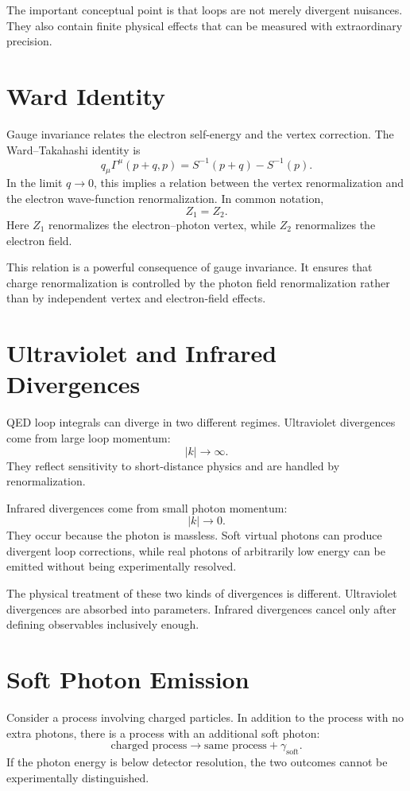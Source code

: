The important conceptual point is that loops are not merely divergent nuisances.
They also contain finite physical effects that can be measured with extraordinary
precision.

\section{Ward Identity}

Gauge invariance relates the electron self-energy and the vertex correction. The
Ward--Takahashi identity is
\[
    q_\mu\Gamma^\mu(p+q,p)
    = S^{-1}(p+q)-S^{-1}(p).
\]
In the limit \(q\to0\), this implies a relation between the vertex
renormalization and the electron wave-function renormalization. In common
notation,
\[
    Z_1=Z_2.
\]
Here \(Z_1\) renormalizes the electron--photon vertex, while \(Z_2\) renormalizes
the electron field.

This relation is a powerful consequence of gauge invariance. It ensures that
charge renormalization is controlled by the photon field renormalization rather
than by independent vertex and electron-field effects.

\section{Ultraviolet and Infrared Divergences}

QED loop integrals can diverge in two different regimes. Ultraviolet divergences
come from large loop momentum:
\[
    |k|\to\infty.
\]
They reflect sensitivity to short-distance physics and are handled by
renormalization.

Infrared divergences come from small photon momentum:
\[
    |k|\to0.
\]
They occur because the photon is massless. Soft virtual photons can produce
divergent loop corrections, while real photons of arbitrarily low energy can be
emitted without being experimentally resolved.

The physical treatment of these two kinds of divergences is different.
Ultraviolet divergences are absorbed into parameters. Infrared divergences
cancel only after defining observables inclusively enough.

\section{Soft Photon Emission}

Consider a process involving charged particles. In addition to the process with
no extra photons, there is a process with an additional soft photon:
\[
    \text{charged process}\longrightarrow \text{same process}+\gamma_{\mathrm{soft}}.
\]
If the photon energy is below detector resolution, the two outcomes cannot be
experimentally distinguished.

